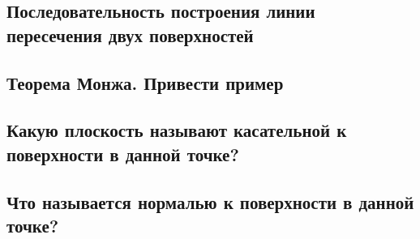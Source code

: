 \documentclass[a4paper, 10pt]{article}
\begin{document}
\subsection{Последовательность построения линии пересечения двух поверхностей}
\subsection{Теорема Монжа. Привести пример}
\subsection{Какую плоскость называют касательной к поверхности в данной точке?}
\subsection{Что называется нормалью к поверхности в данной точке?}
\end{document}
